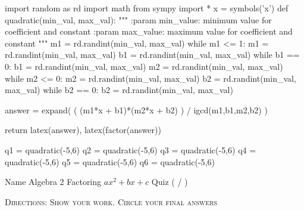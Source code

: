 \documentclass[addpoints]{exam}
\begin{document}
\begin{pycode}
import random as rd
import math
from sympy import *
x = symbols('x')
def quadratic(min_val, max_val):
    """
    :param min_value: minimum value for coefficient and constant
    :param max_value: maximum value for coefficient and constant
    """
    m1 = rd.randint(min_val, max_val)
    while m1 <= 1:
        m1 = rd.randint(min_val, max_val)
    b1 = rd.randint(min_val, max_val)
    while b1 == 0:
        b1 = rd.randint(min_val, max_val)
    m2 = rd.randint(min_val, max_val)
    while m2 <= 0:
        m2 = rd.randint(min_val, max_val)
    b2 = rd.randint(min_val, max_val)
    while b2 == 0:
        b2 = rd.randint(min_val, max_val)
        
    answer = expand( ( (m1*x + b1)*(m2*x + b2) ) /  igcd(m1,b1,m2,b2) )
    
    return latex(answer), latex(factor(answer))
    
q1 = quadratic(-5,6)
q2 = quadratic(-5,6)
q3 = quadratic(-5,6)
q4 = quadratic(-5,6)
q5 = quadratic(-5,6)
q6 = quadratic(-5,6)

\end{pycode}

Name \makebox[3in]{\hrulefill} \hfill Algebra 2 Factoring $ax^2 + bx + c$ Quiz (\makebox[0.35in]{\hrulefill} / \numpoints) \newline

\textsc{Directions: Show your work. Circle your final answers}
\end{document}
